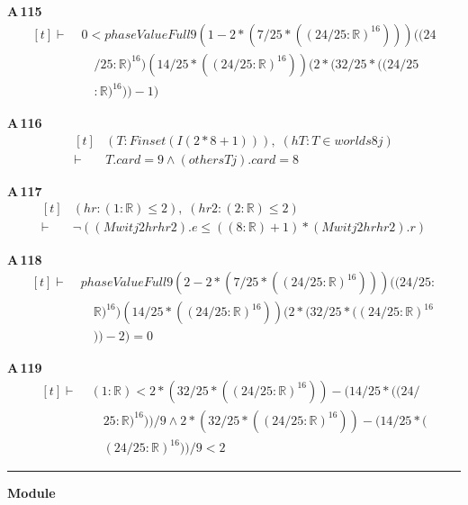 \noindent\textbf{A\,115}\quad{}
{\footnotesize\[ \begin{aligned}[t]
\vdash\;&0 < \mathit{phaseValueFull} 9 (1-2*(7/25*((24/25:\mathbb{R} )^{16}))) ((24\\
&\quad /25:\mathbb{R} )^{16}) (14/25*((24/25:\mathbb{R} )^{16})) (2*(32/25*((24/25\\
&\quad :\mathbb{R} )^{16}))-1)
\end{aligned} \]}

\noindent\textbf{A\,116}\quad{}
{\footnotesize\[ \begin{aligned}[t]
&(\mathit{T} : \mathit{Finset} (\mathit{I} (2*8+1))),\; (\mathit{hT} : \mathit{T} \in \mathit{worlds} 8 \mathit{j})\\
\vdash\;&\mathit{T}.\mathit{card} = 9 \wedge (\mathit{others} \mathit{T} \mathit{j}).\mathit{card} = 8
\end{aligned} \]}

\noindent\textbf{A\,117}\quad{}
{\footnotesize\[ \begin{aligned}[t]
&(\mathit{hr} : (1:\mathbb{R} ) \leq 2),\; (\mathit{hr2} : (2:\mathbb{R} ) \leq 2)\\
\vdash\;&\neg ((\mathit{Mwit} \mathit{j} 2 \mathit{hr} \mathit{hr2}).\mathit{e} \leq ((8:\mathbb{R} )+1)*(\mathit{Mwit} \mathit{j} 2 \mathit{hr} \mathit{hr2}).\mathit{r})
\end{aligned} \]}

\noindent\textbf{A\,118}\quad{}
{\footnotesize\[ \begin{aligned}[t]
\vdash\;&\mathit{phaseValueFull} 9 (2-2*(7/25*((24/25:\mathbb{R} )^{16}))) ((24/25:\\
&\quad \mathbb{R} )^{16}) (14/25*((24/25:\mathbb{R} )^{16})) (2*(32/25*((24/25:\mathbb{R} )^{16}\\
&\quad ))-2) = 0
\end{aligned} \]}

\noindent\textbf{A\,119}\quad{}
{\footnotesize\[ \begin{aligned}[t]
\vdash\;&(1:\mathbb{R} ) < 2*(32/25*((24/25:\mathbb{R} )^{16}))-(14/25*((24/\\
&\quad 25:\mathbb{R} )^{16}))/9 \wedge 2*(32/25*((24/25:\mathbb{R} )^{16}))-(14/25*(\\
&\quad (24/25:\mathbb{R} )^{16}))/9 < 2
\end{aligned} \]}

\vspace{4pt}\noindent\rule{\columnwidth}{0.4pt}\par\vspace{2pt}
\noindent\textbf{Module }\par\vspace{3pt}

